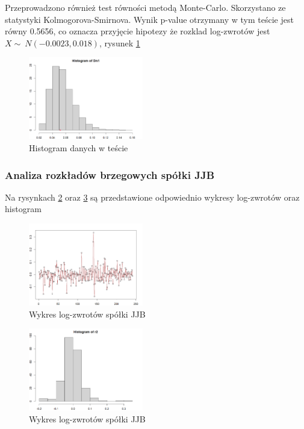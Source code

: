 \documentclass[a4paper,11pt]{article}
\begin{document}
Przeprowadzono również test równości metodą Monte-Carlo. Skorzystano ze statystyki Kolmogorova-Smirnova. Wynik p-value otrzymany w tym teście jest równy 0.5656, co oznacza przyjęcie hipotezy że rozklad log-zwrotów jest  $X \sim\ N(-0.0023, 0.018)$, rysunek \ref{fig:kmr_histMC}

\newpage
 
\begin{figure}[!htb]
	\centering
	\includegraphics[width=5cm]{kmr_histMC.png}
	\caption{Histogram danych w teście }
         \label{fig:kmr_histMC}
\end{figure}

\subsubsection{Analiza rozkładów brzegowych spółki JJB}

Na rysynkach \ref{fig:jjb_wykres_log} oraz \ref{fig:jjb_hist_log} są przedstawione odpowiednio wykresy log-zwrotów oraz histogram
\begin{figure}[!htb]
	\centering
	\includegraphics[width=5cm]{jjb_wykres_log.png}
	\caption{Wykres log-zwrotów spółki JJB}
         \label{fig:jjb_wykres_log}
\end{figure}

\begin{figure}[!htb]
	\centering
	\includegraphics[width=5cm]{jjb_hist_log.png}
	\caption{Wykres log-zwrotów spółki JJB}
         \label{fig:jjb_hist_log}
\end{figure}
\end{document}
